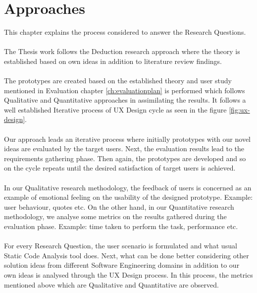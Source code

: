 \chapter{Approaches}
\label{ch:approaches}

This chapter explains the process considered to answer the Research Questions. \\ \\

The Thesis work follows the Deduction research approach where the theory is established based on own ideas in addition to literature review findings. \\ \\

The prototypes are created based on the established theory and user study mentioned in Evaluation chapter \ref{ch:evaluationplan} is performed which follows Qualitative and Quantitative approaches in assimilating the results. It follows a well established Iterative process of UX Design \cite{UX} cycle as seen in the figure \ref{fig:ux-design}. \\ \\

Our approach leads an iterative process where initially prototypes with our novel ideas are evaluated by the target users. Next, the evaluation results lead to the requirements gathering phase. Then again, the prototypes are developed and so on the cycle repeats until the desired satisfaction of target users is achieved. \\ \\

In our Qualitative research methodology, the feedback of users is concerned as an example of emotional feeling on the usability of the designed prototype. Example: user behaviour, quotes etc. On the other hand, in our Quantitative research methodology, we analyse some metrics on the results gathered during the evaluation phase.  Example: time taken to perform the task, performance etc. \\ \\

For every Research Question, the user scenario is formulated and what usual Static Code Analysis tool does. Next, what can be done better considering other solution ideas from different Software Engineering domains in addition to our own ideas is analysed through the UX Design process. In this process, the metrics mentioned above which are Qualitative and Quantitative are observed.  \\ \\


